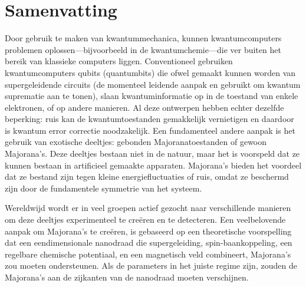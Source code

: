 \chapter*{Samenvatting}
{

Door gebruik te maken van kwantummechanica, kunnen kwantumcomputers problemen oplossen---bijvoorbeeld in de kwantumchemie---die ver buiten het bereik van klassieke computers liggen.
Conventioneel gebruiken kwantumcomputers qubits (quantumbits) die ofwel gemaakt kunnen worden van supergeleidende circuits (de momenteel leidende aanpak en gebruikt om kwantum suprematie aan te tonen), slaan kwantuminformatie op in de toestand van enkele elektronen, of op andere manieren.
Al deze ontwerpen hebben echter dezelfde beperking: ruis kan de kwantumtoestanden gemakkelijk vernietigen en daardoor is kwantum error correctie noodzakelijk.
Een fundamenteel andere aanpak is het gebruik van exotische deeltjes: gebonden Majoranatoestanden of gewoon Majorana's.
Deze deeltjes bestaan niet in de natuur, maar het is voorspeld dat ze kunnen bestaan in artificieel gemaakte apparaten.
Majorana's bieden het voordeel dat ze bestand zijn tegen kleine energiefluctuaties of ruis, omdat ze beschermd zijn door de fundamentele symmetrie van het systeem.

Wereldwijd wordt er in veel groepen actief gezocht naar verschillende manieren om deze deeltjes experimenteel te creëren en te detecteren.
Een veelbelovende aanpak om Majorana's te creëren, is gebaseerd op een theoretische voorspelling dat een eendimensionale nanodraad die supergeleiding, spin-baankoppeling, een regelbare chemische potentiaal, en een magnetisch veld combineert, Majorana's zou moeten ondersteunen.
Als de parameters in het juiste regime zijn, zouden de Majorana's aan de zijkanten van de nanodraad moeten verschijnen.

}
